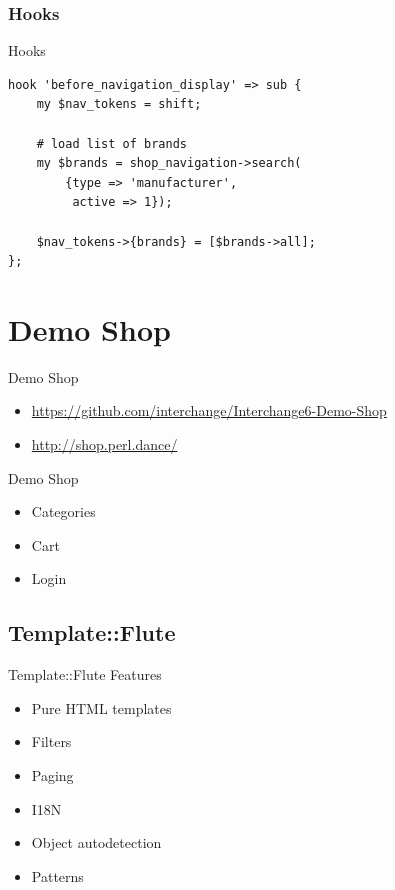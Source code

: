 \subsubsection{Hooks}
\begin{frame}[fragile]{Hooks}
\begin{lstlisting}
hook 'before_navigation_display' => sub {
    my $nav_tokens = shift;

    # load list of brands
    my $brands = shop_navigation->search(
        {type => 'manufacturer',
         active => 1});

    $nav_tokens->{brands} = [$brands->all];
};
\end{lstlisting}
\end{frame}

\section{Demo Shop}
\begin{frame}{Demo Shop}
\begin{itemize}
\item  \url{https://github.com/interchange/Interchange6-Demo-Shop}
\item  \url{http://shop.perl.dance/}
\end{itemize}
\end{frame}

\begin{frame}{Demo Shop}
\begin{itemize}
\item Categories
\item Cart
\item Login
\end{itemize}
\end{frame}

\subsection{Template::Flute}
\begin{frame}{Template::Flute Features}
\begin{itemize}
\item Pure HTML templates
\item Filters
\item Paging
\item I18N
\item Object autodetection
\item Patterns
\end{itemize}
\end{frame}


